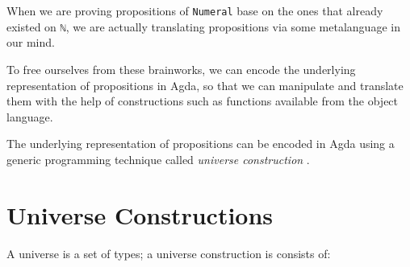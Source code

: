 \documentclass[\main/thesis.tex]{subfiles}
\begin{document}
When we are proving propositions of \lstinline|Numeral| base on the ones that
already existed on \lstinline|ℕ|, we are actually translating propositions via
some metalanguage in our mind.

To free ourselves from these brainworks, we can encode the underlying representation
of propositions in Agda, so that we can manipulate and translate them with the
help of constructions such as functions available from the object language.

\begin{center}
    \begin{adjustbox}{max width=\textwidth}
    \end{adjustbox}
\end{center}

The underlying representation of propositions can be encoded in Agda
using a generic programming technique called \textit{universe construction}
\cite{norell2009dependently}.

\section{Universe Constructions}

A universe is a set of types;
a universe construction is consists of:
\end{document}
